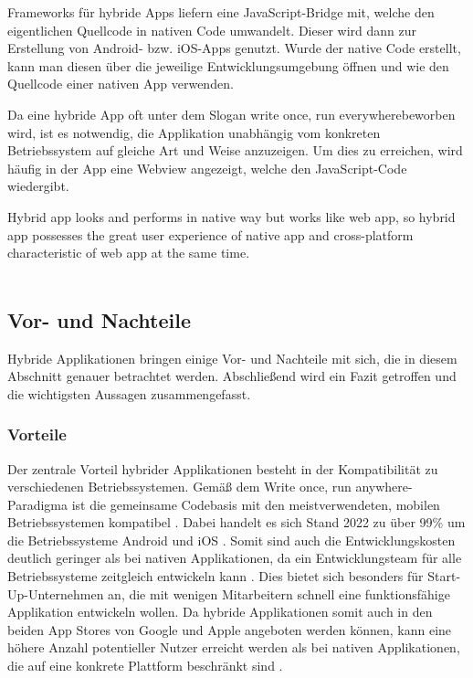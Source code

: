 \documentclass[]{lni}
\begin{document}
Frameworks für hybride Apps liefern eine JavaScript-Bridge mit, welche den eigentlichen Quellcode in nativen Code umwandelt. Dieser wird dann zur Erstellung von Android- bzw. iOS-Apps genutzt. Wurde der native Code erstellt, kann man diesen über die jeweilige Entwicklungsumgebung öffnen und wie den Quellcode einer nativen App verwenden.

Da eine hybride App oft unter dem Slogan \glqq{}write once, run everywhere\grqq\:beworben wird, ist es notwendig, die Applikation unabhängig vom konkreten Betriebssystem auf gleiche Art und Weise anzuzeigen. Um dies zu erreichen, wird häufig in der App eine Webview angezeigt, welche den JavaScript-Code wiedergibt.

\begin{displayquote}
    \glqq Hybrid app looks and performs in native way but works like web app, so hybrid app possesses the great user experience of native app and cross-platform characteristic of web app at the same time.\grqq{}\\
    ~\cite{Que.2016}
\end{displayquote}


\subsection{Vor- und Nachteile}
Hybride Applikationen bringen einige Vor- und Nachteile mit sich, die in diesem Abschnitt genauer betrachtet werden. Abschließend wird ein Fazit getroffen und die wichtigsten Aussagen zusammengefasst.

\subsubsection*{Vorteile}
Der zentrale Vorteil hybrider Applikationen besteht in der Kompatibilität zu verschiedenen Betriebssystemen. Gemäß dem \glqq Write once, run anywhere\grqq-Paradigma ist die gemeinsame Codebasis mit den meistverwendeten, mobilen Betriebssystemen kompatibel \cite{Denko.2021}. Dabei handelt es sich Stand 2022 zu über 99\% um die Betriebssysteme Android und iOS \cite{Statista.06.11.2022}. Somit sind auch die Entwicklungskosten deutlich geringer als bei nativen Applikationen, da ein Entwicklungsteam für alle Betriebssysteme zeitgleich entwickeln kann \cite{Kleinschrod.2020}. Dies bietet sich besonders für Start-Up-Unternehmen an, die mit wenigen Mitarbeitern schnell eine funktionsfähige Applikation entwickeln wollen. Da hybride Applikationen somit auch in den beiden App Stores von Google und Apple angeboten werden können, kann eine höhere Anzahl potentieller Nutzer erreicht werden als bei nativen Applikationen, die auf eine konkrete Plattform beschränkt sind \cite{Tyshchenko.19.06.2020}. 
\end{document}
